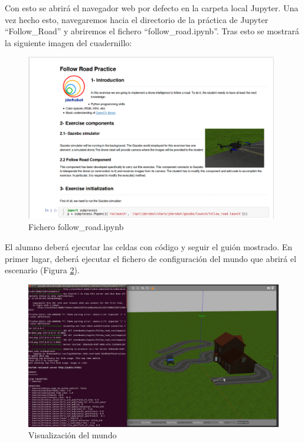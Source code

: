 Con esto se abrirá el navegador web por defecto en la carpeta local Jupyter. Una vez hecho esto, navegaremos hacia el directorio de la práctica de Jupyter ``Follow\_Road'' y abriremos el fichero ``follow\_road.ipynb''. Tras esto se mostrará la siguiente imagen del cuadernillo:

\begin{figure}[H]
  \begin{center}
    \includegraphics[width=0.98\textwidth]{figures/ipynb_followroad.png}
		\caption{Fichero follow\_road.ipynb}
		\label{fig.ffripynb}
		\end{center}
\end{figure}

El alumno deberá ejecutar las celdas con código y seguir el guión mostrado. En primer lugar, deberá ejecutar el fichero de configuración del mundo que abrirá el escenario (Figura \ref{fig.cmdcfr}).

\begin{figure}[H]
  \begin{center}
    \includegraphics[width=.98\textwidth]{figures/celda_mundo_fr.png}
		\caption{Visualización del mundo}
		\label{fig.cmdcfr}
		\end{center}
\end{figure}

